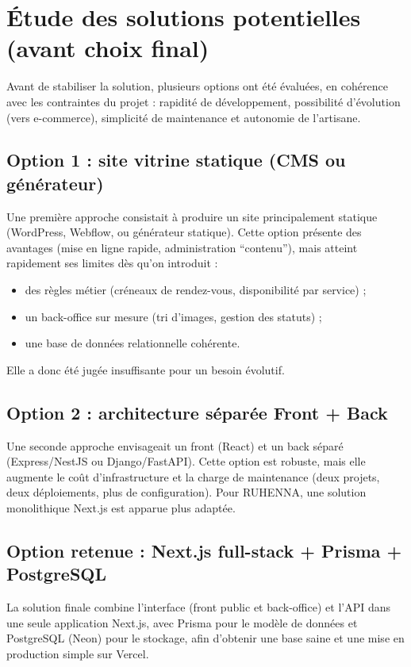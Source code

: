 \section{Étude des solutions potentielles (avant choix final)}
Avant de stabiliser la solution, plusieurs options ont été évaluées, en cohérence avec les contraintes du projet : rapidité de développement, possibilité d’évolution (vers e-commerce), simplicité de maintenance et autonomie de l’artisane.

\subsection{Option 1 : site vitrine statique (CMS ou générateur)}
Une première approche consistait à produire un site principalement statique (WordPress, Webflow, ou générateur statique). Cette option présente des avantages (mise en ligne rapide, administration “contenu”), mais atteint rapidement ses limites dès qu’on introduit :
\begin{itemize}
    \item des règles métier (créneaux de rendez-vous, disponibilité par service) ;
    \item un back-office sur mesure (tri d’images, gestion des statuts) ;
    \item une base de données relationnelle cohérente.
\end{itemize}
Elle a donc été jugée insuffisante pour un besoin évolutif.

\subsection{Option 2 : architecture séparée Front + Back}
Une seconde approche envisageait un front (React) et un back séparé (Express/NestJS ou Django/FastAPI). Cette option est robuste, mais elle augmente le coût d’infrastructure et la charge de maintenance (deux projets, deux déploiements, plus de configuration). Pour RUHENNA, une solution monolithique Next.js est apparue plus adaptée.

\subsection{Option retenue : Next.js full-stack + Prisma + PostgreSQL}
La solution finale combine l’interface (front public et back-office) et l’API dans une seule application Next.js, avec Prisma pour le modèle de données et PostgreSQL (Neon) pour le stockage, afin d’obtenir une base saine et une mise en production simple sur Vercel.

